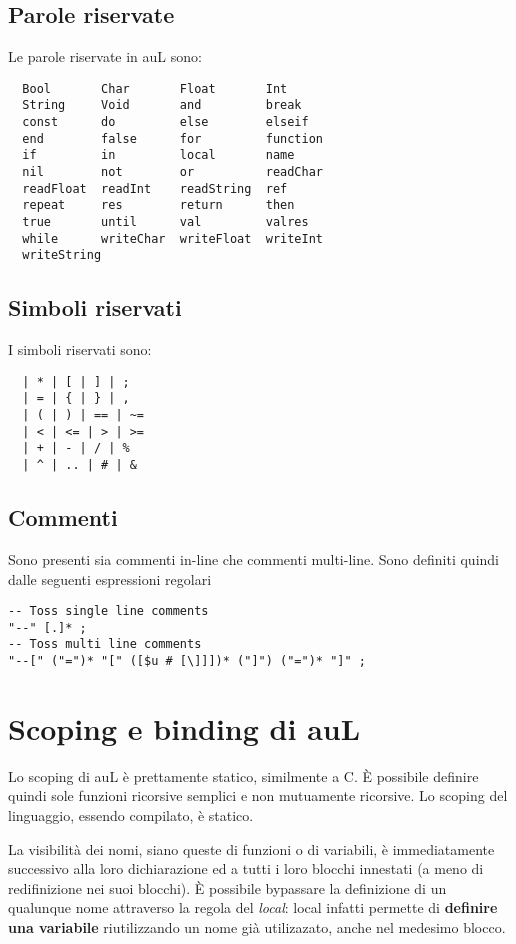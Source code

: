 \documentclass{article}
\begin{document}
\subsection*{Parole riservate}
Le parole riservate in auL sono:
\begin{verbatim}
  Bool       Char       Float       Int
  String     Void       and         break
  const      do         else        elseif
  end        false      for         function
  if         in         local       name
  nil        not        or          readChar
  readFloat  readInt    readString  ref
  repeat     res        return      then
  true       until      val         valres
  while      writeChar  writeFloat  writeInt
  writeString
\end{verbatim}

\subsection*{Simboli riservati}
I simboli riservati sono:
\begin{verbatim}
  | * | [ | ] | ;
  | = | { | } | ,
  | ( | ) | == | ~=
  | < | <= | > | >=
  | + | - | / | %
  | ^ | .. | # | &
\end{verbatim}
\subsection*{Commenti}
Sono presenti sia commenti in-line che commenti multi-line. Sono definiti quindi dalle seguenti espressioni regolari
\begin{verbatim}
-- Toss single line comments
"--" [.]* ;
-- Toss multi line comments
"--[" ("=")* "[" ([$u # [\]]])* ("]") ("=")* "]" ;
\end{verbatim}

\section{Scoping e binding  di auL}
Lo scoping di auL è prettamente statico, similmente a C. È possibile definire quindi sole funzioni ricorsive semplici
e non mutuamente ricorsive. Lo scoping del linguaggio, essendo compilato, è statico.

La visibilità dei nomi, siano queste di funzioni o di variabili, è immediatamente successivo alla loro dichiarazione 
ed a tutti i loro blocchi innestati (a meno di redifinizione nei suoi blocchi). È possibile bypassare la definizione 
di un qualunque nome attraverso la regola del \textit{local}: local infatti permette di \textbf{definire una variabile} 
riutilizzando un nome già utilizazato, anche nel medesimo blocco.
\end{document}

